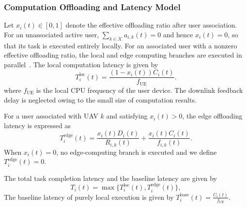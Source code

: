 \documentclass[journal]{IEEEtran}
\begin{document}
\subsubsection{Computation Offloading and Latency Model}

Let $x_i(t)\in[0,1]$ denote the effective offloading ratio after user
association. For an unassociated active user,
$\sum_{k\in\mathcal{K}}a_{i,k}(t)=0$ and hence $x_i(t)=0$, so that its task is
executed entirely locally. For an associated user with a nonzero effective
offloading ratio, the local and edge computing branches are executed in
parallel~\cite{mao2017survey}.
The local computation latency is given by
\begin{equation}\label{eq:tloc}
T_i^{\mathrm{loc}}(t) = \frac{(1 - x_i(t)) C_i(t)}{f_{\mathrm{UE}}}.
\end{equation}
where $f_{\mathrm{UE}}$ is the local CPU frequency of the user device. The
downlink feedback delay is neglected owing to the small size of computation
results.

For a user associated with UAV $k$ and satisfying $x_i(t)>0$, the edge
offloading latency is expressed as
\begin{equation}\label{eq:tedge}
T_i^{\mathrm{edge}}(t)
=
\frac{x_i(t) D_i(t)}{R_{i,k}(t)}
+
\frac{x_i(t) C_i(t)}{f_{i,k}(t)}.
\end{equation}
When $x_i(t)=0$, no edge-computing branch is executed and we define
$T_i^{\mathrm{edge}}(t)=0$.

The total task completion latency and the baseline latency are given by
\begin{equation}
T_i(t) = \max\{T_i^{\mathrm{loc}}(t), T_i^{\mathrm{edge}}(t)\},
\end{equation}
The baseline latency of purely local execution is given by $T_i^{\mathrm{base}}(t) = \frac{C_i(t)}{f_{\mathrm{UE}}}$.
\end{document}

